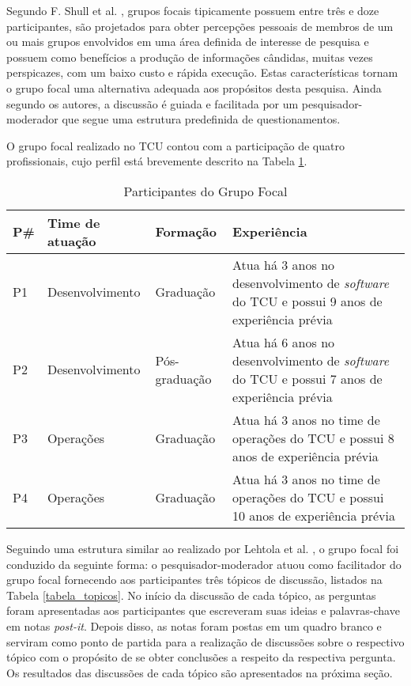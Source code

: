 Segundo F. Shull et al. \cite{shull2007guide}, grupos focais tipicamente
possuem entre três e doze participantes, são projetados para obter percepções
pessoais de membros de um ou mais grupos envolvidos em uma área definida de
interesse de pesquisa e possuem como benefícios a produção de informações
cândidas, muitas vezes perspicazes, com um baixo custo e rápida execução.
Estas características tornam o grupo focal uma alternativa adequada aos
propósitos desta pesquisa. Ainda segundo os autores, a discussão é guiada e
facilitada por um pesquisador-moderador que segue uma estrutura predefinida
de questionamentos.

O grupo focal realizado no \acrshort{TCU} contou com a participação de quatro
profissionais, cujo perfil está brevemente descrito na Tabela \ref{tabela_participantes_grupo_focal}.

\begin{table}[hb!]
\centering
\label{tabela_participantes_grupo_focal}
\begin{tabular}{|p{0.7cm}|p{3.5cm}|p{2.8cm}|p{6.5cm}|} \hline
{\bf P\#} & {\bf Time de atuação} & {\bf Formação} & {\bf Experiência}\\ \hline
P1 & Desenvolvimento & Graduação & Atua há 3 anos no desenvolvimento de {\it software} do \acrshort{TCU} e possui 9 anos de experiência prévia \\ \hline
P2 & Desenvolvimento & Pós-graduação & Atua há 6 anos no desenvolvimento de {\it software} do \acrshort{TCU} e possui 7 anos de experiência prévia \\ \hline
P3 & Operações & Graduação & Atua há 3 anos no time de operações do \acrshort{TCU} e possui 8 anos de experiência prévia \\ \hline
P4 & Operações & Graduação & Atua há 3 anos no time de operações do \acrshort{TCU} e possui 10 anos de experiência prévia \\ \hline
\end{tabular}
\caption{Participantes do Grupo Focal}
\end{table}

Seguindo uma estrutura similar ao realizado por Lehtola et al. \cite{requirementes_priorization_in_practice},
o grupo focal foi conduzido da seguinte forma: o pesquisador-moderador atuou
como facilitador do grupo focal fornecendo aos participantes três tópicos de
discussão, listados na Tabela \ref{tabela_topicos}. No início da discussão de
cada tópico, as perguntas foram apresentadas aos participantes que escreveram
suas ideias e palavras-chave em notas {\it post-it}. Depois disso, as notas
foram postas em um quadro branco e serviram como ponto de partida para a
realização de discussões sobre o respectivo tópico com o propósito de se obter
conclusões a respeito da respectiva pergunta. Os resultados das discussões de
cada tópico são apresentados na próxima seção.

